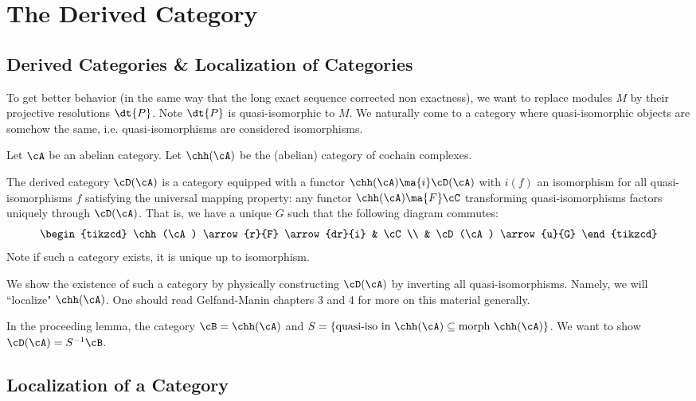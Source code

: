 
\newpage
\section{The Derived Category}

\subsection{Derived Categories \& Localization of Categories}

To get better behavior (in the same way that the long exact sequence corrected non exactness), we want to replace modules $M$ by their projective resolutions $\dt{P}$. Note $\dt{P}$ is quasi-isomorphic to $M$. We naturally come to a category where quasi-isomorphic objects are somehow the same, i.e. quasi-isomorphisms are considered isomorphisms. 

Let $\cA$ be an abelian category. Let $\chh(\cA)$ be the (abelian) category of cochain complexes. 

\begin{dfn}
The derived category $\cD(\cA)$ is a category equipped with a functor $\chh(\cA) \ma{i} \cD(\cA)$ with $i(f)$ an isomorphism for all quasi-isomorphisms $f$ satisfying the universal mapping property: any functor $\chh(\cA) \ma{F} \cC$ transforming quasi-isomorphisms factors uniquely through $\cD(\cA)$. That is, we have a unique $G$ such that the following diagram commutes:
\[
\begin{tikzcd}
\chh(\cA) \arrow{r}{F} \arrow{dr}{i} & \cC \\
& \cD(\cA) \arrow{u}{G}
\end{tikzcd}
\]
Note if such a category exists, it is unique up to isomorphism. 
\end{dfn}

We show the existence of such a category by physically constructing $\cD(\cA)$ by inverting all quasi-isomorphisms. Namely, we will ``localize" $\chh(\cA)$. One should read Gelfand-Manin chapters 3 and 4 for more on this material generally. 

In the proceeding lemma, the category $\cB=\chh(\cA)$ and $S=\{\text{quasi-iso in }\chh(\cA) \subseteq \text{morph }\chh(\cA)\}$. We want to show $\cD(\cA)= S^{-1}\cB$. 

\subsection{Localization of a Category}

